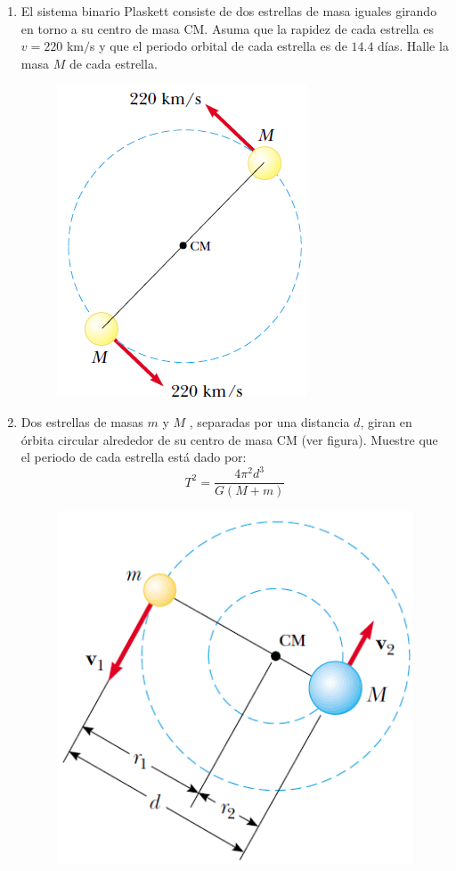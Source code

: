 \documentclass[11pt,twocolumn]{article}
\begin{document}
\begin{enumerate}
\item El sistema binario Plaskett consiste de dos estrellas de masa iguales girando en torno a su centro de masa CM. Asuma que la rapidez de cada estrella es $v=220$ km$/$s y que el periodo orbital de cada estrella es de $14.4$ días. Halle la masa $M$ de cada estrella.
\begin{figure}[h]
\centering
\includegraphics[scale=0.5]{fig3}
\end{figure}


\item Dos estrellas de masas $m$ y $M$ , separadas por una distancia $d$, giran en órbita circular alrededor de su centro de masa CM (ver figura). Muestre que el periodo de cada estrella está dado por:
\begin{displaymath}
T^{2}=\dfrac{4\pi^{2}d^{3}}{G(M+m)}
\end{displaymath}
\begin{figure}[h]
\centering
\includegraphics[scale=0.5]{fig4}
\end{figure}



\end{enumerate}
\end{document}
